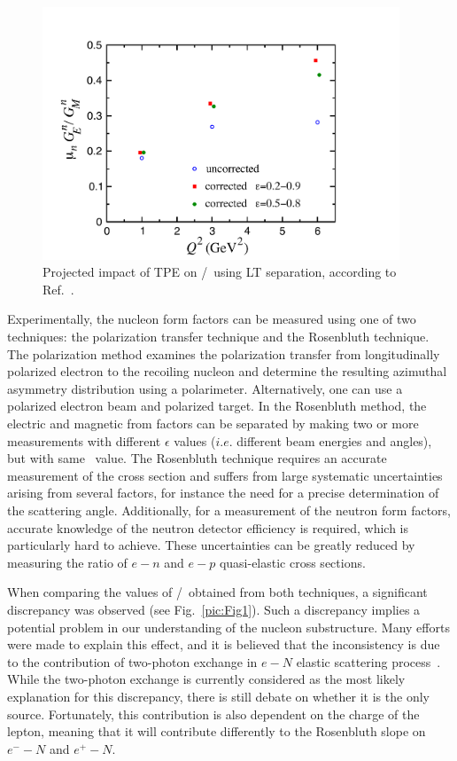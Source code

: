 \begin{figure}[!h]
\includegraphics[width = 0.95\textwidth]{Plots/nTPE-BMT.pdf}
\caption{Projected impact of TPE on \gen/\gmn~using LT separation, according to Ref.~\cite{Blunden:2005ew}.}
\label{pic:Fig2}
\end{figure}
 
Experimentally, the nucleon form factors can be measured using one of two techniques: the polarization transfer technique and the Rosenbluth technique. 
The polarization method examines the polarization transfer from longitudinally polarized electron to the recoiling nucleon and 
determine the resulting azimuthal asymmetry distribution using a polarimeter. 
Alternatively, one can use a polarized electron beam and polarized target. 
In the Rosenbluth method, the electric and magnetic from factors can be separated by making two or more measurements with 
different $\epsilon$ values ($i.e.$ different beam energies and angles), but with same \qsq~value. 
The Rosenbluth technique requires an accurate measurement of the cross section and suffers from large systematic uncertainties arising from several factors, for instance
the need for a precise determination of the scattering angle. Additionally,
for a measurement of the neutron form factors, accurate knowledge of
the neutron detector efficiency is required, which is particularly hard to
achieve.
These uncertainties can be greatly reduced by measuring the ratio of $e-n$ and $e-p$ quasi-elastic cross sections.

When comparing the values of \gep/\gmp~obtained from both techniques, a significant discrepancy was observed (see Fig.~\ref{pic:Fig1}). 
Such a discrepancy implies a potential problem in our understanding of the nucleon substructure. 
Many efforts were made to explain this effect, and it is believed that the inconsistency is due to the contribution of two-photon exchange
in $e-N$ elastic scattering process~\cite{Arrington:2011dn, Afanasev:2017gsk}.
While the two-photon exchange is currently considered as the most likely explanation for this discrepancy, there is still debate on whether it is the only source.
Fortunately, this contribution is also dependent on the charge of the lepton, meaning that it will contribute differently to the Rosenbluth slope on $e^--N$ and $e^+-N$.

